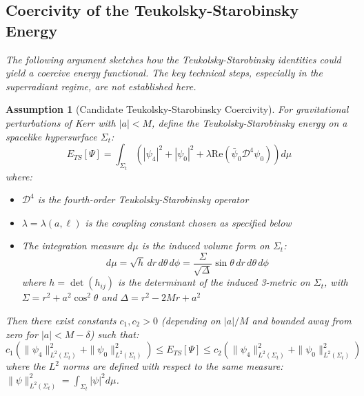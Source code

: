 \documentclass[12pt,a4paper]{article}
\newtheorem{assumption}[theorem]{Assumption}
\begin{document}
\subsection{Coercivity of the Teukolsky-Starobinsky Energy}

\textit{The following argument sketches how the Teukolsky-Starobinsky identities could yield a coercive energy functional. The key technical steps, especially in the superradiant regime, are not established here.}

\begin{assumption}[Candidate Teukolsky-Starobinsky Coercivity]\label{thm:TS-energy}
For gravitational perturbations of Kerr with $|a| < M$, define the Teukolsky-Starobinsky energy on a spacelike hypersurface $\Sigma_t$:
\begin{equation}
E_{TS}[\Psi] = \int_{\Sigma_t}\left(|\psi_4|^2 + |\psi_0|^2 + \lambda\text{Re}(\bar{\psi}_0\mathcal{D}^4\psi_0)\right)d\mu
\end{equation}
where:
\begin{itemize}
    \item $\mathcal{D}^4$ is the fourth-order Teukolsky-Starobinsky operator
    \item $\lambda = \lambda(a, \ell)$ is the coupling constant chosen as specified below
    \item The integration measure $d\mu$ is the induced volume form on $\Sigma_t$:
    \begin{equation}
    d\mu = \sqrt{h}\, dr\, d\theta\, d\phi = \frac{\Sigma}{\sqrt{\Delta}}\sin\theta\, dr\, d\theta\, d\phi
    \end{equation}
    where $h = \det(h_{ij})$ is the determinant of the induced 3-metric on $\Sigma_t$, with $\Sigma = r^2 + a^2\cos^2\theta$ and $\Delta = r^2 - 2Mr + a^2$
\end{itemize}

Then there exist constants $c_1, c_2 > 0$ (depending on $|a|/M$ and bounded away from zero for $|a| < M - \delta$) such that:
\begin{equation}
c_1\left(\|\psi_4\|_{L^2(\Sigma_t)}^2 + \|\psi_0\|_{L^2(\Sigma_t)}^2\right) \leq E_{TS}[\Psi] \leq c_2\left(\|\psi_4\|_{L^2(\Sigma_t)}^2 + \|\psi_0\|_{L^2(\Sigma_t)}^2\right)
\end{equation}
where the $L^2$ norms are defined with respect to the same measure: $\|\psi\|_{L^2(\Sigma_t)}^2 = \int_{\Sigma_t}|\psi|^2 d\mu$.
\end{assumption}
\end{document}
